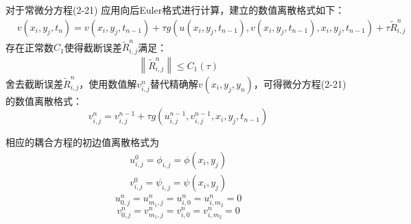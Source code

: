 \documentclass[twoside,UTF8]{nputhesis}
\begin{document}
对于常微分方程(2-21) 应用向后Euler格式进行计算，建立的数值离散格式如下：
\begin{equation}
\begin{aligned}
&v\left(x_{i}, y_{j}, t_{n}\right)=v\left(x_{i}, y_{j}, t_{n-1}\right)+\tau g\left(u\left(x_{i}, y_{j}, t_{n-1}\right), v\left(x_{i}, y_{j}, t_{n-1}\right), x_{i}, y_{j}, t_{n-1}\right)+\tau \tilde{R}_{i, j}^{n}
\end{aligned}
\end{equation}
存在正常数$C_{1}$使得截断误差$\tilde{R}_{i,j}^{n}$满足：
\begin{equation}
\begin{split}
\left\| \tilde{R}_{i,j}^{n} \right\|\le C_{1}(\tau )
\end{split}
\end{equation}
舍去截断误差$\tilde{R}_{i,j}^{n}$，使用数值解$v^{n}_{i,j}$替代精确解$v(x_{i},y_{j},y_{n})$，可得微分方程(2-21)的数值离散格式：
\begin{equation}
v_{i, j}^{n}=v_{i, j}^{n-1}+\tau g\left(u_{i, j}^{n-1}, v_{i, j}^{n-1}, x_{i}, y_{j}, t_{n-1}\right)
\end{equation}

相应的耦合方程的初边值离散格式为
\begin{equation}
\begin{split}
u_{i,j}^{0}={{\phi }_{i,j}}=\phi ({{x}_{i}},{{y}_{j}})
\end{split}
\end{equation}
\begin{equation}
\begin{split}
v_{i,j}^{0}={{\psi}_{i,j}}=\psi ({{x}_{i}},{{y}_{j}})
\end{split}
\end{equation}
\begin{equation}
u_{0,j}^{n}=u_{{{m}_{1}},j}^{n}=u_{i,0}^{n}=u_{i,{{m}_{2}}}^{n}=0
\end{equation} 
\begin{equation}
v_{0,j}^{n}=v_{{{m}_{1}},j}^{n}=v_{i,0}^{n}=v_{i,{{m}_{2}}}^{n}=0
\end{equation} 
\end{document}

